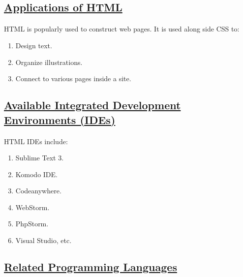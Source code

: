 \documentclass[12pt]{article}
\begin{document}
{                         \subsection*{\underline {Applications of HTML}}
                              \paragraph{}
                               HTML is popularly used to construct web pages. It is used along side CSS to:
                              \begin{enumerate}
                              	\item Design text.
                              	\item Organize illustrations.
                              	\item Connect to various pages inside a site.
                              \end{enumerate}                          
                       \subsection*{\underline {Available Integrated Development Environments (IDEs)}}
                              \paragraph{}
                              HTML IDEs include:                              
                              \begin{enumerate}
                              	\item Sublime Text 3.
                              	\item Komodo IDE.
                              	\item Codeanywhere.
                              	\item WebStorm.
                              	\item PhpStorm.
                              	\item Visual Studio, etc.
                              \end{enumerate}                          
                       \subsection*{\underline {Related Programming Languages}
}}
\end{document}
